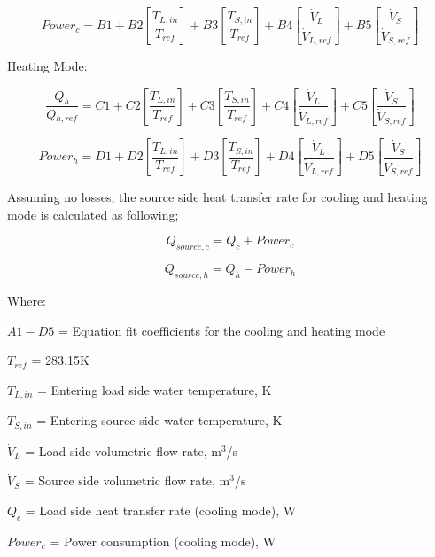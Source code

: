 \begin{equation}
Powe{r_c} = B1 + B2\left[ {\frac{{T{}_{L,in}}}{{T{}_{ref}}}} \right] + B3\left[ {\frac{{T{}_{S,in}}}{{T{}_{ref}}}} \right] + B4\left[ {\frac{{{{\dot V}_L}}}{{{{\dot V}_{L,ref}}}}} \right] + B5\left[ {\frac{{{{\dot V}_S}}}{{{{\dot V}_{S,ref}}}}} \right]
\end{equation}

Heating Mode:

\begin{equation}
\frac{{{Q_h}}}{{Q{}_{h,ref}}} = C1 + C2\left[ {\frac{{T{}_{L,in}}}{{T{}_{ref}}}} \right] + C3\left[ {\frac{{T{}_{S,in}}}{{T{}_{ref}}}} \right] + C4\left[ {\frac{{{{\dot V}_L}}}{{{{\dot V}_{L,ref}}}}} \right] + C5\left[ {\frac{{{{\dot V}_S}}}{{{{\dot V}_{S,ref}}}}} \right]
\end{equation}

\begin{equation}
Powe{r_h} = D1 + D2\left[ {\frac{{T{}_{L,in}}}{{T{}_{ref}}}} \right] + D3\left[ {\frac{{T{}_{S,in}}}{{T{}_{ref}}}} \right] + D4\left[ {\frac{{{{\dot V}_L}}}{{{{\dot V}_{L,ref}}}}} \right] + D5\left[ {\frac{{{{\dot V}_S}}}{{{{\dot V}_{S,ref}}}}} \right]
\end{equation}

Assuming no losses, the source side heat transfer rate for cooling and heating mode is calculated as following;

\begin{equation}
{Q_{source,c}} = {Q_c} + Powe{r_c}
\end{equation}

\begin{equation}
{Q_{source,h}} = {Q_h} - Powe{r_h}
\end{equation}

Where:

\(A1 - D5\) = Equation fit coefficients for the cooling and heating mode

\({T_{ref}}\) = 283.15K

\({T_{L,in}}\) = Entering load side water temperature, K

\({T_{S,in}}\) = Entering source side water temperature, K

\({\dot V_L}\) = Load side volumetric flow rate, m\(^{3}\)/s

\({\dot V_S}\) = Source side volumetric flow rate, m\(^{3}\)/s

\({Q_c}\) = Load side heat transfer rate (cooling mode), W

\(Powe{r_c}\) = Power consumption (cooling mode), W

